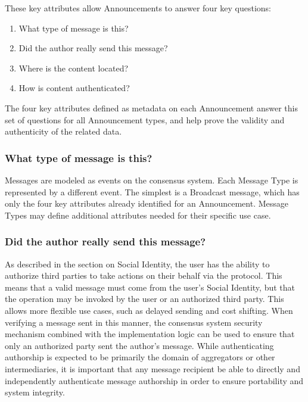 \documentclass[12pt,letterpaper]{article}
\providecommand{\tightlist}{%
\setlength{\itemsep}{0pt}\setlength{\parskip}{0pt}}
\begin{document}
\begin{samepage}
	These key attributes allow Announcements to answer four key questions:

	\begin{enumerate}
		\tightlist
		\item
		      What type of message is this?
		\item
		      Did the author really send this message?
		\item
		      Where is the content located?
		\item
		      How is content authenticated?
	\end{enumerate}
\end{samepage}

The four key attributes defined as metadata on each Announcement answer this set of
questions for all Announcement types, and help prove the validity and authenticity of the
related data.

\subsubsection{What type of message is this?}

Messages are modeled as events on the consensus system. Each Message Type is represented by
a different event. The simplest is a Broadcast message, which has only the four key
attributes already identified for an Announcement. Message Types may define additional
attributes needed for their specific use case.

\subsubsection{Did the author really send this message?}

As described in the section on Social Identity, the user has the ability to authorize third
parties to take actions on their behalf via the protocol. This means that a valid message
must come from the user's Social Identity, but that the operation may be invoked by the user
or an authorized third party. This allows more flexible use cases, such as delayed sending
and cost shifting. When verifying a message sent in this manner, the consensus system
security mechanism combined with the implementation logic can be used to ensure that only an
authorized party sent the author's message. While authenticating authorship is expected to
be primarily the domain of aggregators or other intermediaries, it is important that any
message recipient be able to directly and independently authenticate message authorship in
order to ensure portability and system integrity.
\end{document}
